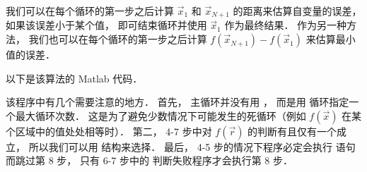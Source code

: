 我们可以在每个循环的第一步之后计算 $\vec x_1$ 和 $\vec x_{N+1}$ 的距离来估算自变量的误差， 如果该误差小于某个值， 即可结束循环并使用 $\vec x_1$ 作为最终结果． 作为另一种方法， 我们也可以在每个循环的第一步之后计算 $f(\vec x_{N+1}) - f(\vec x_1)$ 来估算最小值的误差．

以下是该算法的 Matlab 代码．


该程序中有几个需要注意的地方． 首先， 主循环并没有用 ， 而是用  循环指定一个最大循环次数． 这是为了避免少数情况下可能发生的死循环（例如 $f(\vec x)$ 在某个区域中的值处处相等时）． 第二， 4-7 步中对 $f(\vec r)$ 的判断有且仅有一个成立， 所以我们可以用  结构来选择． 最后， 4-5 步的情况下程序必定会执行  语句而跳过第 8 步， 只有 6-7 步中的  判断失败程序才会执行第 8 步．




